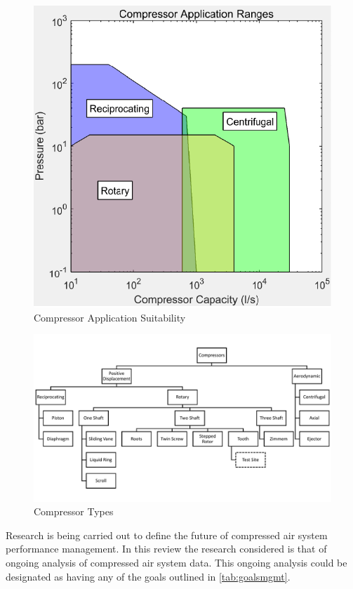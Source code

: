 \begin{figure}
\includegraphics[width = \columnwidth]{./Images/CompApps.pdf}
\caption{Compressor Application Suitability}
\label{fig:CompApps}
\end{figure}
\begin{figure}

\includegraphics[width = \textwidth]{./Images/CompressorClassification.pdf}
\caption{Compressor Types}
\label{fig:comptypes}
\end{figure}

Research is being carried out to define the future of compressed air system performance management. In this review the research considered is that of ongoing analysis of compressed air system data. This ongoing analysis could be designated as having any of the goals outlined in \autoref{tab:goalsmgmt}.

